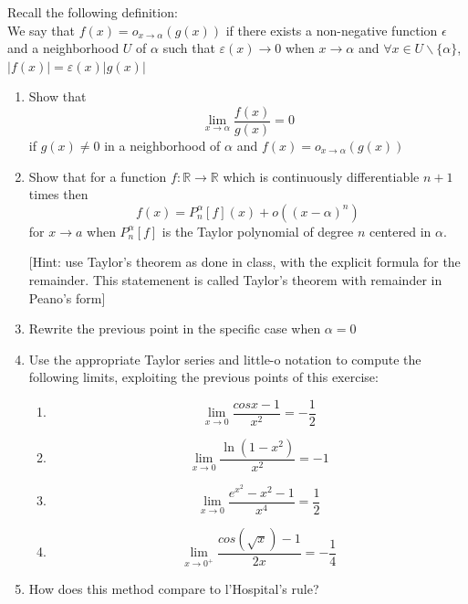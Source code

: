 \documentclass[11pt]{article}%
\newcommand{\R}{\mathbb{R}}
\begin{document}
\begin{Exercise}[title=**$\dagger$]
Recall the following definition:\\

We say that $f(x)=o_{x\rightarrow \alpha}(g(x))$ if there exists a non-negative function $\epsilon$ and a neighborhood $U$ of $\alpha$ such that 
$\varepsilon(x)\rightarrow 0$ when $x \rightarrow \alpha$ and $\forall x\in U \backslash  \{\alpha\}$, $|f(x)|=\varepsilon(x)|g(x)|$

\begin{enumerate}
	\item Show that $$\lim_{x\to \alpha} \frac{f(x)}{g(x)}=0$$ if $g(x)\neq 0$ in a neighborhood of $\alpha$ and $f(x)=o_{x\rightarrow \alpha}(g(x))$
	
	\item Show that for a function $f:\R\to\R$ which is continuously differentiable $n+1$ times then
	$$ f(x) = P_n^\alpha[f](x) + o((x-\alpha)^n)$$
	for $x\to a$ when $P_n^\alpha[f]$ is the Taylor polynomial of degree $n$ centered in $\alpha$.
	
	[Hint: use Taylor's theorem as done in class, with the explicit formula for the remainder. This statemenent is called Taylor's theorem with remainder in Peano's form]
	
	\item Rewrite the previous point in the specific case when $\alpha=0$

\item Use the appropriate Taylor series and little-o notation to compute the following limits, exploiting the previous points of this exercise:
\begin{enumerate}
	\item $$\lim_{x\rightarrow 0} \frac{cosx-1}{x^2}=-\frac{1}{2}$$
	\item $$\lim_{x\rightarrow 0} \frac{\ln(1-x^2)}{x^2} = -1$$
	\item $$\lim_{x\rightarrow 0} \frac{e^{x^2}-x^2-1}{x^4}= \frac{1}{2}$$
	\item $$\lim_{x\rightarrow 0^+} \frac{cos(\sqrt{x})-1}{2x}=-\frac{1}{4}$$
\end{enumerate}
\item
How does this method compare to l'Hospital's rule?
\end{enumerate}
\end{Exercise}
\end{document}
